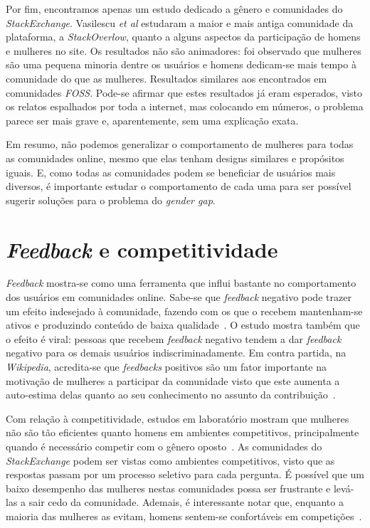 Por fim, encontramos apenas um estudo dedicado a gênero e comunidades do \emph{StackExchange}. Vasilescu \emph{et al} estudaram a maior e mais antiga comunidade da plataforma, a \emph{StackOverlow}, quanto a alguns aspectos da participação de homens e mulheres no site. Os resultados não são animadores: foi observado que mulheres são uma pequena minoria dentre os usuários e homens dedicam-se mais tempo à comunidade do que as mulheres. Resultados similares aos encontrados em comunidades \emph{FOSS}. Pode-se afirmar que estes resultados já eram esperados, visto os relatos espalhados por toda a internet, mas colocando em números, o problema parece ser mais grave e, aparentemente, sem uma explicação exata.

\bigskip

Em resumo, não podemos generalizar o comportamento de mulheres para todas as comunidades online, mesmo que elas tenham designs similares e propósitos iguais. E, como todas as comunidades podem se beneficiar de usuários mais diversos, é importante estudar o comportamento de cada uma para ser possível sugerir soluções para o problema do \textit{gender gap}.

\section{\emph{Feedback} e competitividade}

\emph{Feedback} mostra-se como uma ferramenta que influi bastante no comportamento dos usuários em comunidades online. Sabe-se que \emph{feedback} negativo pode trazer um efeito indesejado à comunidade, fazendo com os que o recebem mantenham-se ativos e produzindo conteúdo de baixa qualidade~\cite{cheng2014community}. O estudo mostra também que o efeito é viral: pessoas que recebem \emph{feedback} negativo tendem a dar \emph{feedback} negativo para os demais usuários indiscriminadamente. Em contra partida, na \emph{Wikipedia}, acredita-se que \emph{feedbacks} positivos são um fator importante na motivação de mulheres a participar da comunidade visto que este aumenta a auto-estima delas quanto ao seu conhecimento no assunto da contribuição~\cite{collier2012conflict}.

Com relação à competitividade, estudos em laboratório mostram que mulheres não são tão eficientes quanto homens em ambientes competitivos, principalmente quando é necessário competir com o gênero oposto~\cite{gneezy2003performance}. As comunidades do \emph{StackExchange} podem ser vistas como ambientes competitivos, visto que as respostas passam por um processo seletivo para cada pergunta. É possível que um baixo desempenho das mulheres nestas comunidades possa ser frustrante e levá-las a sair cedo da comunidade. Ademais, é interessante notar que, enquanto a maioria das mulheres as evitam, homens sentem-se confortáveis em competições~\cite{niederle2005women,croson2009gender}.

